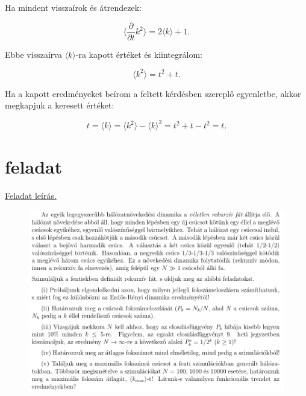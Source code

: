\documentclass[a4paper, 12pt]{article}
\numberwithin{equation}{section}          %
\numberwithin{figure}{subsection}
\begin{document}
Ha mindent visszaírok és átrendezek:

\begin{center}
	\begin{equation}
	\langle \frac{\partial}{\partial t}k^2\rangle = 2 \langle k \rangle + 1.
	\end{equation}
\end{center}

Ebbe visszaírva $\langle k \rangle$-ra kapott értéket és kiintegrálom:

\begin{center}
	\begin{equation}
	\langle k^2 \rangle = t^2 + t.
	\end{equation}
\end{center}

Ha a kapott eredményeket beírom a feltett kérdésben szereplő egyenletbe, akkor megkapjuk a keresett értéket:

\begin{center}
	\begin{equation}
	t = \langle k \rangle = \langle k^2 \rangle - \langle k \rangle^2 = t^2 + t - t^2 = t.
	\end{equation}
\end{center}


\clearpage
\section{feladat}

\begin{center}
	\underline{Feladat leírás.}
\end{center}

\begin{figure}[h!]
	\begin{center}
		\includegraphics[width=1\textwidth]{masodik.png}
	\end{center}
\end{figure}
\end{document}
